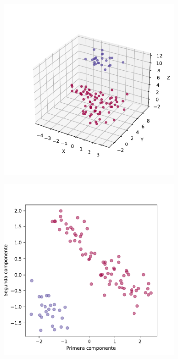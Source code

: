 \begin{figure}[h]
  \centering
  \begin{subfigure}{0.45\textwidth}
    \centering
    \includegraphics[width=\textwidth]{figures/kmeans-3d.pdf}
    \caption{}
    \label{fig:kmeans-3d}
  \end{subfigure}
  \begin{subfigure}{0.45\textwidth}
    \centering
    \includegraphics[width=\textwidth]{figures/kmeans-pca.pdf}

\end{subfigure}
\end{figure}
